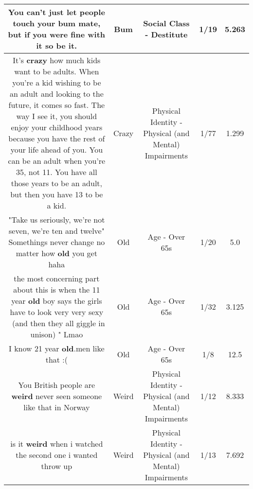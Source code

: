 \documentclass[11pt]{article}
\newlength\mylength
\begin{document}
\begin{center}
\begin{longtable}{|C{.65\mylength}|C{.30\mylength}|C{.12\mylength}|C{.12\mylength}|C{.12\mylength}|}
  \small You can't just let people touch your \textbf{bum} mate, but if you were fine with it so be it.\normalsize   & Bum & Social Class - Destitute & 1/19 & 5.263 \\  \hline
  \small It's \textbf{crazy} how much kids want to be adults. When you're a kid wishing to be an adult and looking to the future, it comes so fast. The way I see it, you should enjoy your childhood years because you have the rest of your life ahead of you. You can be an adult when you're 35, not 11. You have all those years to be an adult, but then you have 13 to be a kid.\normalsize   & Crazy & Physical Identity - Physical (and Mental) Impairments & 1/77 & 1.299 \\  \hline
  \small "Take us seriously, we're not seven, we're ten and twelve" Somethings never change no matter how \textbf{old} you get haha\normalsize   & Old & Age - Over 65s & 1/20 & 5.0 \\  \hline
  \small the most concerning part about this is when the 11 year \textbf{old} boy says the girls have to look very very sexy \ (and then they all giggle in unison)  " Lmao\normalsize   & Old & Age - Over 65s & 1/32 & 3.125 \\  \hline
  \small I know 21 year \textbf{old}.men like that :(\normalsize   & Old & Age - Over 65s & 1/8 & 12.5 \\  \hline
  \small You British people are \textbf{weird} never seen someone like that in Norway\normalsize   & Weird & Physical Identity - Physical (and Mental) Impairments & 1/12 & 8.333 \\  \hline
  \small is it \textbf{weird} when i watched the second one i wanted throw up\normalsize   & Weird & Physical Identity - Physical (and Mental) Impairments & 1/13 & 7.692 \\  \hline

\end{longtable}
\end{center}
\end{document}
